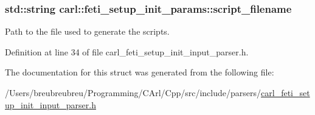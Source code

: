 \hypertarget{structcarl_1_1feti__setup__init__params_a7e27a98f8d0d0d5b6381ba9fd40f777b}{}
\subsubsection[{script\+\_\+filename}]{\setlength{\rightskip}{0pt plus 5cm}std\+::string carl\+::feti\+\_\+setup\+\_\+init\+\_\+params\+::script\+\_\+filename}\label{structcarl_1_1feti__setup__init__params_a7e27a98f8d0d0d5b6381ba9fd40f777b}


Path to the file used to generate the scripts. 



Definition at line 34 of file carl\+\_\+feti\+\_\+setup\+\_\+init\+\_\+input\+\_\+parser.\+h.



The documentation for this struct was generated from the following file\+:\begin{DoxyCompactItemize}
\item 
/\+Users/breubreubreu/\+Programming/\+C\+Arl/\+Cpp/src/include/parsers/\hyperlink{carl__feti__setup__init__input__parser_8h}{carl\+\_\+feti\+\_\+setup\+\_\+init\+\_\+input\+\_\+parser.\+h}\end{DoxyCompactItemize}
